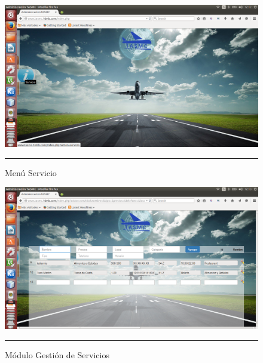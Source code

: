 \begin{figure}[h!]
	\centering
		\includegraphics[width=1\textwidth]{Figuras/indexServicio.png}
		\rule{35em}{0.5pt}
	\caption[Menú Servicio]{Menú Servicio}
	\label{fig:menuServicio}
\end{figure}

\begin{figure}[h!]
	\centering
		\includegraphics[width=1\textwidth]{Figuras/servicioswb.png}
		\rule{35em}{0.5pt}
	\caption[Módulo Gestión de Servicios]{Módulo Gestión de Servicios}
	\label{fig:moduloUsuarios}
\end{figure}
\clearpage

